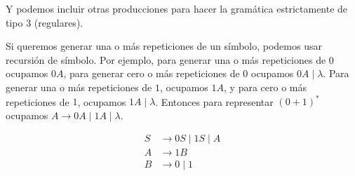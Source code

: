 Y podemos incluir otras producciones para hacer la gramática estrictamente de tipo 3 (regulares).

Si queremos generar una o más repeticiones de un símbolo, podemos usar recursión de símbolo. 
Por ejemplo, para generar una o más repeticiones de $0$ ocupamos $0A$, para generar cero o más 
repeticiones de $0$ ocupamos $0A \mid \lambda$.
Para generar una o más repeticiones de $1$, ocupamos $1A$, y para cero o más repeticiones 
de $1$, ocupamos $1A \mid \lambda$. Entonces para representar 
$(0+1)^{*}$ ocupamos $A \rightarrow 0A \mid 1A \mid \lambda$.

\begin{align*}
    S &\rightarrow 0S \mid 1S \mid A \\
    A &\rightarrow 1B \\
    B &\rightarrow 0 \mid 1
\end{align*}







